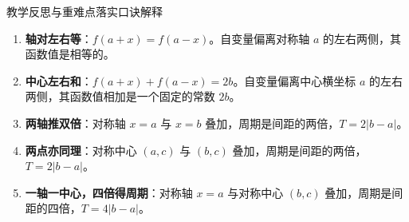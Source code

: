 \documentclass[11pt,a4paper]{ctexart}
\begin{document}
\begin{teachbox}{教学反思与重难点落实口诀解释}
  \begin{enumerate}
    \item \textbf{轴对左右等}：$f(a+x) = f(a-x)$。自变量偏离对称轴 $a$ 的左右两侧，其函数值是相等的。
    \item \textbf{中心左右和}：$f(a+x) + f(a-x) = 2b$。自变量偏离中心横坐标 $a$ 的左右两侧，其函数值相加是一个固定的常数 $2b$。
    \item \textbf{两轴推双倍}：对称轴 $x=a$ 与 $x=b$ 叠加，周期是间距的两倍，$T = 2|b-a|$。
    \item \textbf{两点亦同理}：对称中心 $(a, c)$ 与 $(b, c)$ 叠加，周期是间距的两倍，$T = 2|b-a|$。
    \item \textbf{一轴一中心，四倍得周期}：对称轴 $x=a$ 与对称中心 $(b, c)$ 叠加，周期是间距的四倍，$T = 4|b-a|$。
  \end{enumerate}
\end{teachbox}
\end{document}
